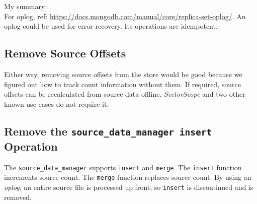 \documentclass[12pt,twoside]{article}
\newcommand \sscope {\textit{SectorScope}\xspace}
\begin{document}
My summary:\\
For oplog, ref: \url{https://docs.mongodb.com/manual/core/replica-set-oplog/}. An oplog could be used for error recovery.  Its operations are idempotent.

\subsection{Remove Source Offsets}
Either way, removing source offsets from the store would be good because we figured out how to track count information without them. If required, source offsets can be recalculated from source data offline. \sscope and two other known use-cases do not require it.

\subsection{Remove the \texttt{source\_data\_manager insert} Operation}
The \verb+source_data_manager+ supports \verb+insert+ and \verb+merge+.
The \verb+insert+ function increments source count.
The \verb+merge+ function replaces source count.
By using an \textit{oplog}, an entire source file is processed up front, so \verb+insert+ is discontinued and is removed.
\end{document}
